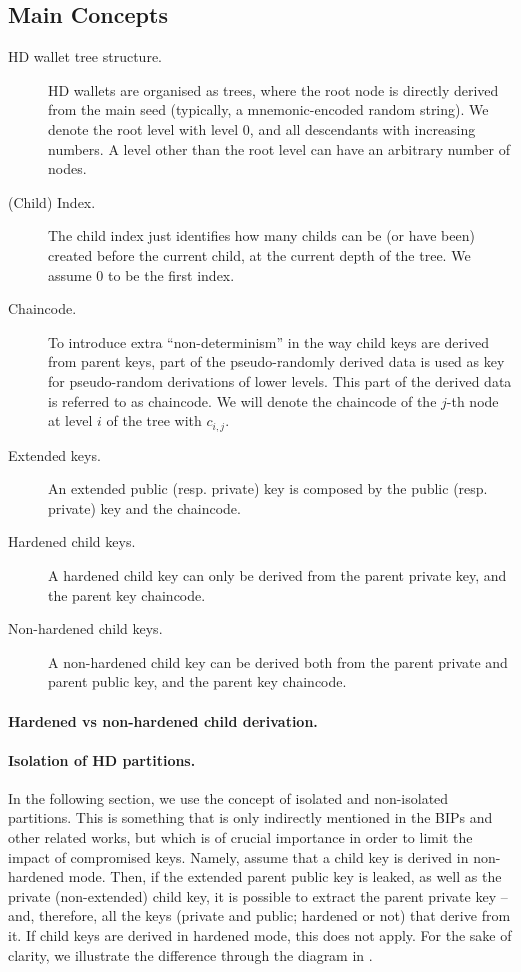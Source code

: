 \subsection{Main Concepts}

\begin{description}
\item[HD wallet tree structure.] HD wallets are organised as trees, where the
  root node is directly derived from the main seed (typically, a mnemonic-encoded
  random string). We denote the root level with level $0$, and all descendants
  with increasing numbers. A level other than the root level can have an
  arbitrary number of nodes.
\item[(Child) Index.] The child index just identifies how many childs can be (or
  have been) created before the current child, at the current depth of the tree.
  We assume $0$ to be the first index.
\item[Chaincode.] To introduce extra ``non-determinism'' in the way child keys
  are derived from parent keys, part of the pseudo-randomly derived data is
  used as key for pseudo-random derivations of lower levels. This part of the
  derived data is referred to as chaincode. We will denote the chaincode of the
  $j$-th node at level $i$ of the tree with $c_{i,j}$.
\item[Extended keys.] An extended public (resp. private) key is composed by the
  public (resp. private) key and the chaincode.  
\item[Hardened child keys.] A hardened child key can only be derived from the
  parent private key, and the parent key chaincode. 
\item[Non-hardened child keys.] A non-hardened child key can be derived both
  from the parent private and parent public key, and the parent key chaincode.
\end{description}

\paragraph{Hardened vs non-hardened child derivation.}

\paragraph{Isolation of HD partitions.} In the following section, we use
the concept of isolated and non-isolated partitions. This is something that is
only indirectly mentioned in the BIPs and other related works, but which is of
crucial importance in order to limit the impact of compromised keys. Namely,
assume that a child key is derived in non-hardened mode. Then, if the extended
parent public key is leaked, as well as the private (non-extended) child key, it
is possible to extract the parent private key -- and, therefore, all the keys
(private and public; hardened or not) that derive from it. If child keys are
derived in hardened mode, this does not apply. For the sake of clarity, we
illustrate the difference through the diagram in .

